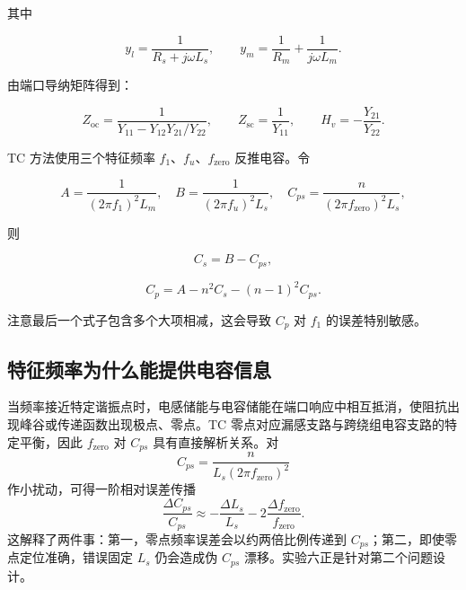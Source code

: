 \documentclass[UTF8,a4paper,12pt]{ctexart}
\begin{document}
其中

\begin{equation}
y_l = \frac{1}{R_s+j\omega L_s}, \qquad
y_m = \frac{1}{R_m}+\frac{1}{j\omega L_m}.
\end{equation}

由端口导纳矩阵得到：

\begin{equation}
Z_{\mathrm{oc}} =
\frac{1}{Y_{11}-Y_{12}Y_{21}/Y_{22}}, \qquad
Z_{\mathrm{sc}} = \frac{1}{Y_{11}}, \qquad
H_v = -\frac{Y_{21}}{Y_{22}}.
\end{equation}

TC 方法使用三个特征频率 $f_1$、$f_u$、$f_{\mathrm{zero}}$ 反推电容。令

\begin{equation}
A = \frac{1}{(2\pi f_1)^2L_m}, \quad
B = \frac{1}{(2\pi f_u)^2L_s}, \quad
C_{ps} = \frac{n}{(2\pi f_{\mathrm{zero}})^2L_s},
\end{equation}

则

\begin{equation}
C_s = B-C_{ps},
\end{equation}

\begin{equation}
C_p = A-n^2C_s-(n-1)^2C_{ps}.
\end{equation}

注意最后一个式子包含多个大项相减，这会导致 $C_p$ 对 $f_1$ 的误差特别敏感。

\subsection{特征频率为什么能提供电容信息}

当频率接近特定谐振点时，电感储能与电容储能在端口响应中相互抵消，使阻抗出现峰谷或传递函数出现极点、零点。TC 零点对应漏感支路与跨绕组电容支路的特定平衡，因此 $f_{\mathrm{zero}}$ 对 $C_{ps}$ 具有直接解析关系。对
\begin{equation}
C_{ps}=\frac{n}{L_s(2\pi f_{\mathrm{zero}})^2}
\end{equation}
作小扰动，可得一阶相对误差传播
\begin{equation}
\frac{\Delta C_{ps}}{C_{ps}}
\approx
-\frac{\Delta L_s}{L_s}
-2\frac{\Delta f_{\mathrm{zero}}}{f_{\mathrm{zero}}}.
\label{eq:cps-error-propagation}
\end{equation}
这解释了两件事：第一，零点频率误差会以约两倍比例传递到 $C_{ps}$；第二，即使零点定位准确，错误固定 $L_s$ 仍会造成伪 $C_{ps}$ 漂移。实验六正是针对第二个问题设计。
\end{document}
